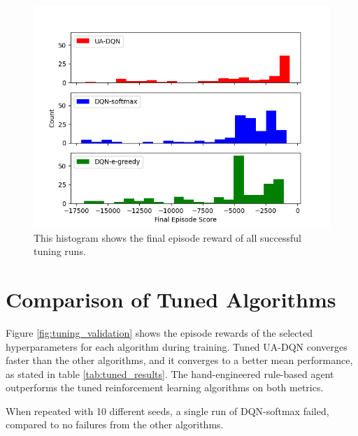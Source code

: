\begin{figure}
  \centering
  \includegraphics[width=\figurewidth]{figures/tuning_results.png}
  \caption{This histogram shows the final episode reward of all successful tuning runs.}
  \label{fig:tuning_results}
\end{figure}

\section{Comparison of Tuned Algorithms}
Figure \ref{fig:tuning_validation} shows the episode rewards of the selected hyperparameters for each algorithm during training.
Tuned UA-DQN converges faster than the other algorithms, and it converges to a better mean performance, as stated in table \ref{tab:tuned_results}. The hand-engineered rule-based agent outperforms the tuned reinforcement learning algorithms on both metrics.

When repeated with 10 different seeds, a single run of DQN-softmax failed, compared to no failures from the other algorithms.


